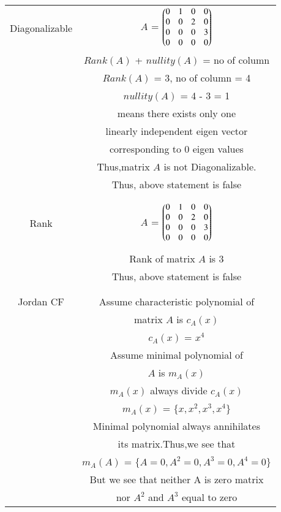 \begin{table*}[ht!]
\begin{center}
\begin{tabular}{|c|c|}
\hline
Diagonalizable & $A$ = $\begin{pmatrix}0&1&0&0\\
                0&0&2&0\\
                0&0&0&3\\
                0&0&0&0\end{pmatrix}$\\
& $Rank(A)$ + $nullity(A)$ = no of column\\
& $Rank(A)$ = 3, no of column = 4 \\
& $nullity(A)$ = 4 - 3 = 1\\
& means there exists only one\\
& linearly independent eigen vector\\
& corresponding to $0$ eigen values\\
& Thus,matrix $A$ is not Diagonalizable.\\
& Thus, above statement is false\\
& \\
\hline
& \\
Rank & $A$ = $\begin{pmatrix}0&1&0&0\\
                0&0&2&0\\
                0&0&0&3\\
                0&0&0&0\end{pmatrix}$\\
& \\
& Rank of matrix $A$ is $3$\\
& Thus, above statement is false\\
& \\
\hline
& \\
Jordan CF & Assume characteristic polynomial of \\
& matrix $A$ is $c_A(x)$ \\
& $c_A(x)$ = $x^4$ \\
& Assume minimal polynomial of\\
& $A$ is $m_A(x)$\\
& $m_A(x)$ always divide $c_A(x)$ \\
& $m_A(x)$ = $\{x,x^2,x^3,x^4\}$\\
& Minimal polynomial always annihilates\\
& its matrix.Thus,we see that\\
& $m_A(A)$ = $\{A=0,A^2=0,A^3=0,A^4=0\}$\\
& But we see that neither A is zero matrix\\
& nor $A^2$ and $A^3$ equal to zero\\

\end{tabular}
\end{center}
\end{table*}
